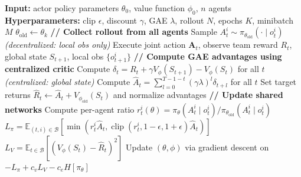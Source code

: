 \begin{algorithm}[H]
  \caption{Multi-Agent Proximal Policy Optimization (MAPPO), adapted from~\cite{yu2021mappo, schulman2017ppo, schulman2016gae}.}
  \label{alg:mappo}
  \begin{algorithmic}[1]
    \STATE \textbf{Input:} actor policy parameters $\theta_0$, value function $\phi_0$, $n$ agents
    \STATE \textbf{Hyperparameters:} clip $\epsilon$, discount $\gamma$, GAE $\lambda$, rollout $N$, epochs $K$, minibatch $M$
      \STATE $\theta_{\text{old}} \leftarrow \theta_k$
      \STATE \textbf{// Collect rollout from all agents}
          \STATE Sample $A_t^i \sim \pi_{\theta_{\text{old}}}(\cdot \mid o_t^i)$ \hfill \textit{(decentralized: local obs only)}
        \ENDFOR
        \STATE Execute joint action $\mathbf{A}_t$, observe team reward $R_t$, global state $S_{t+1}$, local obs $\{o_{t+1}^i\}$
      \ENDFOR
      \STATE \textbf{// Compute GAE advantages using centralized critic}
      \STATE Compute $\delta_t = R_t + \gamma V_\phi(S_{t+1}) - V_\phi(S_t)$ for all $t$ \hfill \textit{(centralized: global state)}
      \STATE Compute $\hat{A}_t = \sum_{l=0}^{T-1-t} (\gamma\lambda)^l \delta_{t+l}$ for all $t$
      \STATE Set target returns $\hat{R}_t \leftarrow \hat{A}_t + V_{\phi_{\mathrm{old}}}(S_t)$ and normalize advantages
      \STATE \textbf{// Update shared networks}
          \STATE Compute per-agent ratio $r_t^i(\theta) = \pi_\theta(A_t^i \mid o_t^i) / \pi_{\theta_{\text{old}}}(A_t^i \mid o_t^i)$
          \STATE $L_\pi = \mathbb{E}_{(t,i) \in \mathcal{B}}[\min(r_t^i \hat{A}_t, \operatorname{clip}(r_t^i, 1-\epsilon, 1+\epsilon) \hat{A}_t)]$
          \STATE $L_V = \mathbb{E}_{t \in \mathcal{B}}[(V_\phi(S_t) - \hat{R}_t)^2]$
          \STATE Update $(\theta, \phi)$ via gradient descent on $-L_\pi + c_v L_V - c_e H[\pi_\theta]$
        \ENDFOR
      \ENDFOR
    \ENDFOR
  \end{algorithmic}
\end{algorithm}

